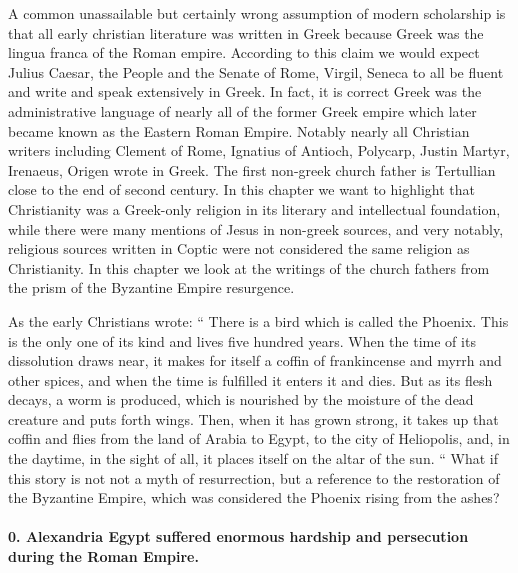 A common unassailable but certainly wrong assumption of modern scholarship is that all early christian literature was written in Greek because Greek was the lingua franca of the Roman empire.
According to this claim we would expect Julius Caesar, the People and the Senate of Rome, Virgil, Seneca to all be fluent and write and speak extensively in Greek.
In fact, it is correct Greek was the administrative language of nearly all of the former Greek empire which later became known as the Eastern Roman Empire.
Notably nearly all Christian writers including Clement of Rome, Ignatius of Antioch, Polycarp, Justin Martyr, Irenaeus, Origen wrote in Greek.
The first non-greek church father is Tertullian close to the end of second century.
In this chapter we want to highlight that Christianity was a Greek-only religion in its literary and intellectual foundation, while there were many mentions of Jesus in non-greek sources, and very notably, religious sources written in Coptic were not considered the same religion as Christianity.
In this chapter we look at the writings of the church fathers from the prism of the Byzantine Empire resurgence.

As the early Christians wrote:
``
There is a bird which is called the Phoenix.
This is the only one of its kind and lives five hundred years.
When the time of its dissolution draws near, it makes for itself a coffin of frankincense and myrrh and other spices, and when the time is fulfilled it enters it and dies.
But as its flesh decays, a worm is produced, which is nourished by the moisture of the dead creature and puts forth wings.
Then, when it has grown strong, it takes up that coffin and flies from the land of Arabia to Egypt, to the city of Heliopolis, and, in the daytime, in the sight of all, it places itself on the altar of the sun.
``
What if this story is not not a myth of resurrection, but a reference to the restoration of the Byzantine Empire, which was considered the Phoenix rising from the ashes?

\paragraph{0.
Alexandria Egypt suffered enormous hardship and persecution during the Roman Empire.}\label{par:alexandria-egypt-suffered-enormous-hardship-and-persecution-during-the-roman-empire.}

